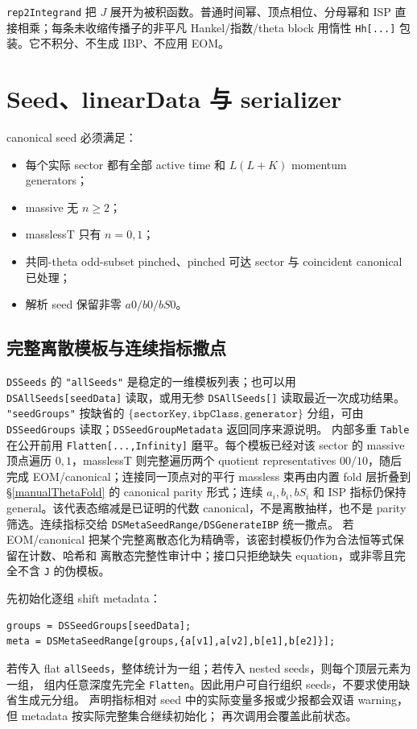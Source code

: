 ﻿\documentclass[a4paper,11pt]{article}
\begin{document}
\texttt{rep2Integrand} 把 $J$ 展开为被积函数。普通时间幂、顶点相位、分母幂和 ISP 直接相乘；每条未收缩传播子的非平凡 Hankel/指数/theta block 用惰性 \texttt{Hh[...]} 包装。它不积分、不生成 IBP、不应用 EOM。

\section{Seed、linearData 与 serializer}

canonical seed 必须满足：
\begin{itemize}
  \item 每个实际 sector 都有全部 active time 和 $L(L+K)$ momentum generators；
  \item massive 无 $n\ge2$；
  \item masslessT 只有 $n=0,1$；
  \item 共同-theta odd-subset pinched、pinched 可达 sector 与 coincident canonical 已处理；
  \item 解析 seed 保留非零 $a0/b0/bS0$。
\end{itemize}

\subsection{完整离散模板与连续指标撒点}

\texttt{DSSeeds} 的 \texttt{"allSeeds"} 是稳定的一维模板列表；也可以用
\texttt{DSAllSeeds[seedData]} 读取，或用无参 \texttt{DSAllSeeds[]} 读取最近一次成功结果。
\texttt{"seedGroups"} 按缺省的 $\{\texttt{sectorKey},\texttt{ibpClass},\texttt{generator}\}$
分组，可由 \texttt{DSSeedGroups} 读取；\texttt{DSSeedGroupMetadata} 返回同序来源说明。
内部多重 \texttt{Table} 在公开前用 \texttt{Flatten[...,Infinity]} 磨平。每个模板已经对该
sector 的 massive 顶点遍历 $0,1$，masslessT 则完整遍历两个 quotient representatives $00/10$，随后完成 EOM/canonical；连接同一顶点对的平行 massless 束再由内置 fold 层折叠到 \S\ref{manualThetaFold} 的 canonical parity 形式；连续 $a_i,b_i,bS_i$ 和 ISP 指标仍保持 general。该代表态缩减是已证明的代数 canonical，不是离散抽样，也不是 parity 筛选。连续指标交给
\texttt{DSMetaSeedRange/DSGenerateIBP} 统一撒点。
若 EOM/canonical 把某个完整离散态化为精确零，该密封模板仍作为合法恒等式保留在计数、哈希和
离散态完整性审计中；接口只拒绝缺失 equation，或非零且完全不含 \texttt{J} 的伪模板。

先初始化逐组 shift metadata：
\begin{verbatim}
groups = DSSeedGroups[seedData];
meta = DSMetaSeedRange[groups,{a[v1],a[v2],b[e1],b[e2]}];
\end{verbatim}
若传入 flat \texttt{allSeeds}，整体统计为一组；若传入 nested seeds，则每个顶层元素为一组，
组内任意深度先完全 \texttt{Flatten}。因此用户可自行组织 seeds，不要求使用缺省生成元分组。
声明指标相对 seed 中的实际变量多报或少报都会双语 warning，但 metadata 按实际完整集合继续初始化；
再次调用会覆盖此前状态。
\end{document}

